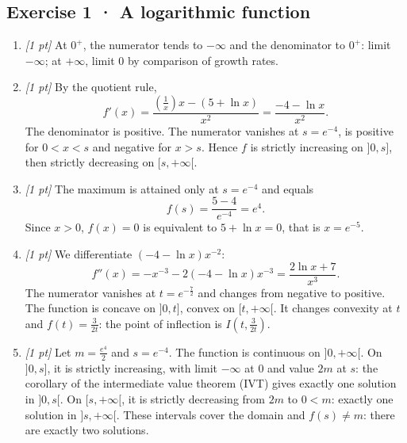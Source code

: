 \subsection*{Exercise 1 · A logarithmic function}\begin{enumerate}

\item \textit{[1 pt]} At $0^+$, the numerator tends to $-\infty$ and the denominator to $0^+$: limit $-\infty$; at $+\infty$, limit $0$ by comparison of growth rates.

\item \textit{[1 pt]} By the quotient rule,
\[f'(x)=\frac{(\frac{1}{x})x-(5+\ln x)}{x^2}=\frac{-4-\ln x}{x^2}.\]
The denominator is positive. The numerator vanishes at $s=e^{-4}$, is positive for $0<x<s$ and negative for $x>s$. Hence $f$ is strictly increasing on $]0,s]$, then strictly decreasing on $[s,+\infty[$.

\item \textit{[1 pt]} The maximum is attained only at $s=e^{-4}$ and equals
\[f(s)=\frac{5- 4}{e^{-4}}=e^{4}.\]
Since $x>0$, $f(x)=0$ is equivalent to $5+\ln x=0$, that is $x=e^{-5}$.

\item \textit{[1 pt]} We differentiate $(-4-\ln x)x^{-2}$:
\[f''(x)=-x^{-3}-2(-4-\ln x)x^{-3}=\frac{2\ln x+7}{x^3}.\]
The numerator vanishes at $t=e^{-\frac{7}{2}}$ and changes from negative to positive. The function is concave on $]0,t]$, convex on $[t,+\infty[$. It changes convexity at $t$ and $f(t)=\frac{3}{2t}$: the point of inflection is $I(t,\frac{3}{2t})$.

\item \textit{[1 pt]} Let $m=\frac{e^{4}}{2}$ and $s=e^{-4}$. The function is continuous on $]0,+\infty[$. On $]0,s]$, it is strictly increasing, with limit $-\infty$ at $0$ and value $2m$ at $s$: the corollary of the intermediate value theorem (IVT) gives exactly one solution in $]0,s[$. On $[s,+\infty[$, it is strictly decreasing from $2m$ to $0<m$: exactly one solution in $]s,+\infty[$. These intervals cover the domain and $f(s)\ne m$: there are exactly two solutions.

\end{enumerate}

